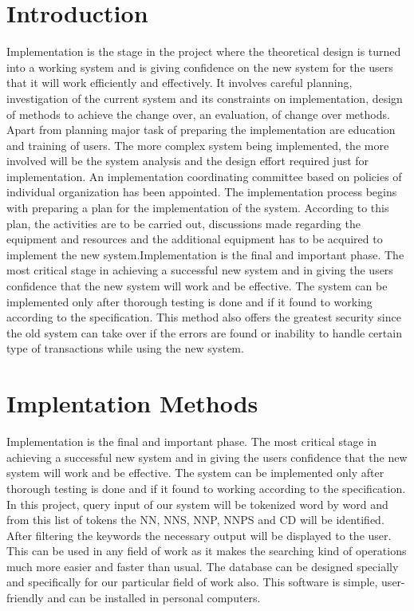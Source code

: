 \section{Introduction}
Implementation is the stage in the project where the theoretical design is turned into a working system and is giving confidence on the new system for the users that it will work efficiently and effectively. It involves careful planning, investigation of the current system and its constraints on implementation, design of methods to achieve the change over, an evaluation, of change over methods. Apart from planning major task of preparing the implementation are education and training of users. The more complex system being implemented, the more involved will be the system analysis and the design effort required just for implementation. An implementation coordinating committee based on policies of individual organization has been appointed. The implementation process begins with preparing a plan for the implementation of the system. According to this plan, the activities are to be carried out, discussions made regarding the equipment and resources and the additional equipment has to be acquired to implement the new system.Implementation is the final and important phase. 
\newline
The most critical stage in achieving a successful new system and in giving the users confidence that the new system will work and be effective. The system can be implemented only after thorough testing is done and if it found to working according to the specification. This method also offers the greatest security since the old system can take over if the errors are found or inability to handle certain type of transactions while using the new system.

\section{Implentation Methods}
Implementation is the final and important phase. The most critical stage in achieving a successful new system and in giving the users confidence that the new system will work and be effective. The system can be implemented only after thorough testing is done and if it found to working according to the specification.
\newline
In this project, query input of our system will be tokenized word by word and from this list of tokens the NN, NNS, NNP, NNPS and CD will be identified. After filtering the keywords the necessary output will be displayed to the user.
\newline
This can be used in any field of work as it makes the searching kind of operations much more easier and faster than usual. The database can be designed specially  and specifically for our particular field of work also. This software is simple,  user-friendly and can be installed in personal computers.

